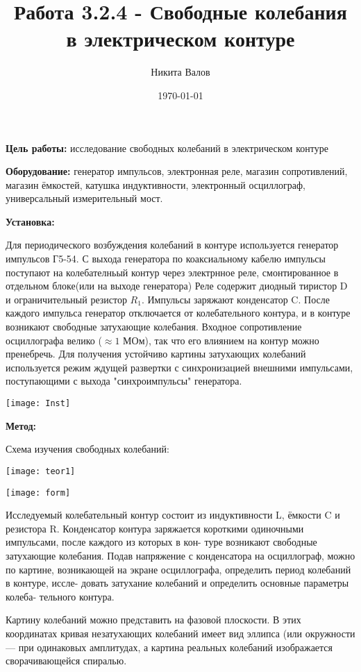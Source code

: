 \documentclass[a4paper,12pt]{article}
\author{Никита Валов}
\title{Работа 3.2.4 - Свободные колебания в электрическом контуре}
\date{\today}
\begin{document}
	\maketitle
	
	\textbf{Цель работы:} исследование свободных колебаний в электрическом контуре
	
	
	\textbf{Оборудование:} генератор импульсов, электронная реле, магазин сопротивлений, магазин ёмкостей, катушка индуктивности, электронный осциллограф, универсальный измерительный мост.
	
	\textbf{Установка:}
	
	Для периодического возбуждения колебаний в контуре используется генератор импульсов Г5-54. С выхода генератора по коаксиальному кабелю импульсы поступают на колебателньый контур через электрнное реле, смонтированное в отдельном блоке(или на выходе генератора) Реле содержит диодный тиристор D и ограничительный резистор $R_1$.
	 Импульсы заряжают конденсатор C. После каждого импульса генератор отключается от колебательного контура, и в контуре возникают свободные затухающие колебания. Входное сопротивление осциллографа велико ($\approx1$ МОм), так что его влиянием на контур можно пренебречь. Для получения устойчиво картины затухающих колебаний используется режим ждущей развертки с синхронизацией внешними импульсами, поступающими с выхода "синхроимпульсы" генератора.
	
	
	\texttt{[image: Inst]}
	
	\textbf{Метод:}
	
	Схема изучения свободных колебаний:
	
	
	\texttt{[image: teor1]}
	
	
	
	\texttt{[image: form]}
	
	
	Исследуемый колебательный контур состоит из индуктивности L, ёмкости C и резистора R. Конденсатор контура заряжается короткими одиночными импульсами, после каждого из которых в кон-
туре возникают свободные затухающие колебания. Подав напряжение
с конденсатора на осциллограф, можно по картине, возникающей на
экране осциллографа, определить период колебаний в контуре, иссле-
довать затухание колебаний и определить основные параметры колеба-
тельного контура.

Картину колебаний можно представить на фазовой
плоскости. В этих координатах кривая незатухающих колебаний 
имеет вид эллипса (или окружности — при одинаковых амплитудах, а картина реальных колебаний изображается сворачивающейся
спиралью.
\end{document}
